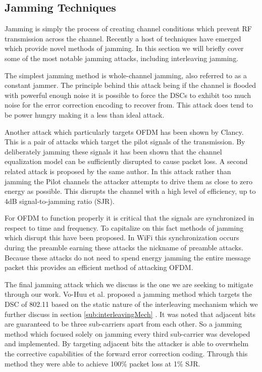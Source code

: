 \documentclass[sigconf]{acmart}
\begin{document}
\subsection{Jamming Techniques}
\label{sec:jamming}

Jamming is simply the process of creating channel conditions which prevent RF transmission across the channel. Recently a host of techniques have emerged which provide novel methods of jamming. In this section we will briefly cover some of the most notable jamming attacks, including interleaving jamming. 

The simplest jamming method is whole-channel jamming, also referred to as a constant jammer\cite{grover2014jamming}. The principle behind this attack being if the channel is flooded with powerful enough noise it is possible to force the DSCs to exhibit too much noise for the error correction encoding to recover from. This attack does tend to be power hungry making it a less than ideal attack. 

Another attack which particularly targets OFDM has been shown by Clancy\cite{clancy2011efficient}. This is a pair of attacks which target the pilot signals of the transmission. By deliberately jamming these signals it has been shown that the channel equalization model can be sufficiently disrupted to cause packet loss. A second related attack is proposed by the same author. In this attack rather than jamming the Pilot channels the attacker attempts to drive them as close to zero energy as possible. This disrupts the channel with a high level of efficiency, up to 4dB signal-to-jamming ratio (SJR).

For OFDM to function properly it is critical that the signals are synchronized in respect to time and frequency. To capitalize on this fact methods of jamming which disrupt this have been proposed\cite{mueller2013efficient, la2013phase}. In WiFi this synchronization occurs during the preamble earning these attacks the nickname of preamble attacks. Because these attacks do not need to spend energy jamming the entire message packet this provides an efficient method of attacking OFDM.

The final jamming attack which we discuss is the one we are seeking to mitigate through our work. Vo-Huu et al. proposed a jamming method which targets the DSC of 802.11 based on the static nature of the interleaving mechanism which we further discuss in section \ref{sub:interleavingMech} \cite{vo2016interleaving}. It was noted that adjacent bits are guaranteed to be three sub-carriers apart from each other. So a jamming method which focused solely on jamming every third sub-carrier was developed and implemented. By targeting adjacent bits the attacker is able to overwhelm the corrective capabilities of the forward error correction coding. Through this method they were able to achieve 100\% packet loss at 1\% SJR. 
\end{document}
